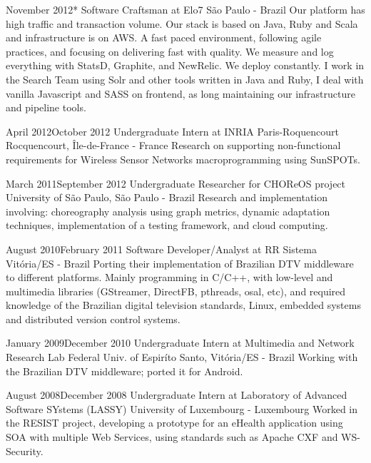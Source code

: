 \documentclass{friggeri-cv}
\begin{document}
\workentry
  {November 2012}{*}
  {Software Craftsman at Elo7}
  {São Paulo - Brazil}
  {Our platform has high traffic and transaction volume. Our stack is based on Java, Ruby and Scala and infrastructure
  is on AWS. A fast paced environment, following agile practices, and focusing on delivering fast with quality. We
  measure and log everything with StatsD, Graphite, and NewRelic. We deploy constantly. I work in the Search Team using
  Solr and other tools written in Java and Ruby, I deal with vanilla Javascript and SASS on frontend, as long maintaining our infrastructure and pipeline tools.}

\workentry
  {April 2012}{October 2012}
  {Undergraduate Intern at INRIA Paris-Roquencourt}
  {Rocquencourt, Île-de-France - France}
  {Research on supporting non-functional requirements for Wireless Sensor Networks macroprogramming using SunSPOTs.}

\workentry
  {March 2011}{September 2012}
  {Undergraduate Researcher for CHOReOS project}
  {University of São Paulo, São Paulo - Brazil}
  {Research and implementation involving: choreography analysis using graph metrics,
  dynamic adaptation techniques, implementation of a testing framework, and cloud computing.}

\workentry
  {August 2010}{February 2011}
  {Software Developer/Analyst at RR Sistema}
  {Vitória/ES - Brazil}
  {Porting their implementation of Brazilian DTV middleware to different platforms.
  Mainly programming in C/C++, with low-level and multimedia libraries (GStreamer, DirectFB, pthreads, osal, etc),
  and required knowledge of the Brazilian digital television standards, Linux, embedded systems and
  distributed version control systems.}

\workentry
  {January 2009}{December 2010}
  {Undergraduate Intern at Multimedia and Network Research Lab}
  {Federal Univ. of Espiríto Santo, Vitória/ES - Brazil}
  {Working with the Brazilian DTV middleware; ported it for Android. }

\workentry
  {August 2008}{December 2008}
  {Undergraduate Intern at Laboratory of Advanced Software SYstems (LASSY)}
  {University of Luxembourg - Luxembourg}
  {Worked in the RESIST project, developing a prototype for an eHealth application using SOA with multiple Web Services,
  using standards such as Apache CXF and WS-Security.}

\end{document}
